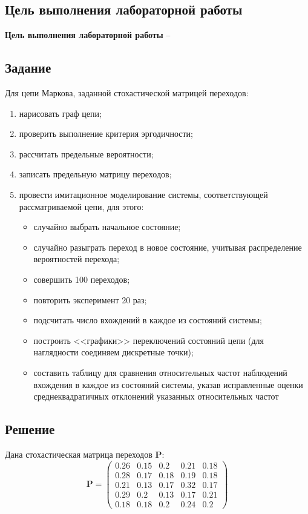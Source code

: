 \subsection{Цель выполнения лабораторной работы}\label{blockN.VariantM}
\textbf{Цель выполнения лабораторной работы }-- \GoalOfResearch

\subsection{Задание}
Для цепи Маркова, заданной стохастической матрицей переходов:
\begin{enumerate}
    \item нарисовать граф цепи;
    \item проверить выполнение критерия эргодичности;
    \item рассчитать предельные вероятности;
    \item записать предельную матрицу переходов;
    \item провести имитационное моделирование системы, соответствующей рассматриваемой цепи, для этого:
    \begin{itemize}
        \item случайно выбрать начальное состояние;
        \item случайно разыграть переход в новое состояние, учитывая распределение вероятностей перехода;
        \item совершить 100 переходов;
        \item повторить эксперимент 20 раз;
        \item подсчитать число вхождений в каждое из состояний системы;
        \item  построить <<графики>> переключений состояний цепи (для наглядности соединяем дискретные точки);
        \item составить таблицу для сравнения относительных частот наблюдений вхождения в каждое из состояний системы, указав исправленные оценки среднеквадратичных отклонений указанных относительных частот
    \end{itemize}
\end{enumerate}
\newpage
\subsection{Решение}
Дана стохастическая матрица переходов $\mathbf{P}$:
$$\mathbf{P}=\begin{pmatrix}
0.26 & 0.15 & 0.2 & 0.21 & 0.18 \\
0.28 & 0.17 & 0.18 & 0.19 & 0.18 \\
0.21 & 0.13 & 0.17 & 0.32 & 0.17 \\
0.29 & 0.2 & 0.13 & 0.17 & 0.21 \\
0.18 & 0.18 & 0.2 & 0.24 & 0.2
\end{pmatrix}$$

